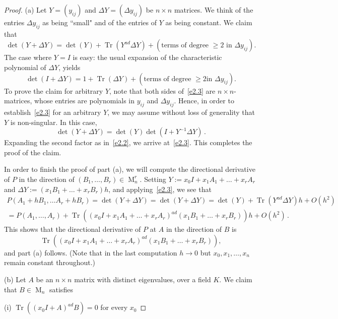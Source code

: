 \documentclass[12pt]{amsart}
\numberwithin{equation}{section}
\numberwithin{subsection}{section}
\theoremstyle{definition} \newtheorem{definition}[theorem]{Definition}
\newcommand{\tr}{\operatorname{Tr}}
\newcommand{\Mat}{\operatorname{M}}
\begin{document}
\begin{proof} (a) 
Let $Y = (y_{ij})$ and  $\Delta Y = (\Delta y_{ij})$ be 
$n \times n$ matrices. We think of
the entries $\Delta y_{ij}$ as being ``small"
and of the entries of $Y$ as being constant.
We claim that
\begin{equation} \label{e2.3}
\det(Y + \Delta Y) = \det(Y) + \tr(Y^{ad} \Delta Y) + 
(\text{terms of degree $\geqslant 2$ in 
$\Delta y_{ij}$}). 
\end{equation}
The case where $Y = I$ is easy: the usual expansion of 
the characteristic polynomial of $\Delta Y$, yields
\begin{equation} \label{e2.2}
\det(I + \Delta Y) = 1 + \tr(\Delta Y) + (\text{terms of degree $\geqslant 2$
in $\Delta y_{ij}$}). 
\end{equation}
To prove the claim for arbitrary $Y$, note that
both sides of~\eqref{e2.3} are $n \times n$-matrices, whose entries are 
polynomials in $y_{ij}$ and $\Delta y_{ij}$. Hence, 
in order to establish~\eqref{e2.3} for an arbitrary $Y$,  
we may assume without loss of generality that $Y$ is non-singular.
In this case, 
\[ \det(Y + \Delta Y) = \det(Y) \det(I + Y^{-1} \Delta Y) \, .  \]
Expanding the second factor as in~\eqref{e2.2}, we arrive at~\eqref{e2.3}.
This completes the proof of the claim.

In order to finish the proof of part (a), we will 
compute the directional derivative of $P$
in the direction of $(B_1, \dots, B_r) \in \Mat_n^r$. 
Setting $Y:= x_0 I + x_1 A_1 + \dots + x_r A_r$ and
$\Delta Y := (x_1 B_1 + \dots + x_r B_r) h$, and 
applying~\eqref{e2.3}, we see that
\begin{align*} 
P(A_1 + hB_1, \dots A_r + hB_r) = \det(Y + \Delta Y) = 
\det(Y + \Delta Y) = \det(Y) + \tr(Y^{ad} \Delta Y) h + O(h^2) \\ 
= 
P(A_1, \dots, A_r) + \tr( (x_0 I + x_1 A_1 + \dots + x_r A_r)^{ad} 
(x_1 B_1 + \dots + x_r B_r) ) h + O(h^2) \, . 
\end{align*} 
This shows that the directional derivative
of $P$ at $A$ in the direction of $B$ 
is \[ \tr( (x_0 I + x_1 A_1 + \dots + x_r A_r)^{ad} 
(x_1 B_1 + \dots + x_r B_r) ), \] and part (a) follows. 
(Note that in the last computation
$h \to 0$ but $x_0, x_1, \dots, x_n$ remain constant throughout.) 

\smallskip
(b) Let $A$ be an $n \times n$ matrix 
with distinct eigenvalues, over a field $K$.
We claim that $B \in \Mat_n$ satisfies 

\smallskip
(i) $\tr((x_0 I + A)^{ad} B) = 0$ for every
$x_0$ 


\end{proof}
\end{document}
